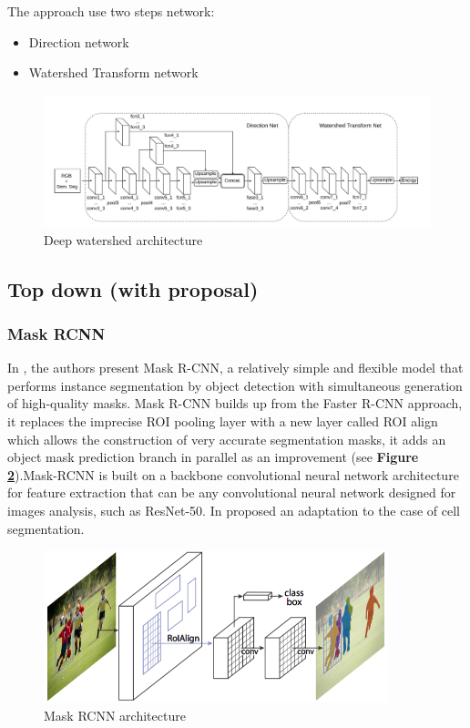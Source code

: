 \documentclass[main.tex]{subfiles}
\begin{document}
The approach use two steps network: 
\begin{itemize}
    \item Direction  network
    \item Watershed Transform network
\end{itemize}

\begin{figure}[H]
    \centering
    \includegraphics[width=16cm]{images/deepwatershed.png}
    \caption{Deep watershed architecture}
    \label{fig:deepwatershed}
\end{figure}



\subsection{Top down (with proposal)}
\subsubsection{Mask RCNN}
In \cite{he2017mask}, the authors present Mask R-CNN, a relatively simple and flexible model that performs instance segmentation by object detection with simultaneous generation of high-quality masks. Mask R-CNN builds up from the Faster R-CNN approach, it replaces the imprecise ROI pooling layer with a new layer called ROI align which allows the construction of very accurate segmentation masks, it adds an object mask prediction branch in parallel as an improvement (see \textbf{Figure \ref{fig:maskrcnn}}).Mask-RCNN is built on a backbone convolutional neural network architecture for feature extraction that can be any convolutional neural network designed for images analysis, such as ResNet-50. In \cite{johnson2018adapting} proposed an adaptation to the case of cell segmentation.

\begin{figure}[H]
    \centering
    \includegraphics[width=10cm]{images/mask-rcnn.png}
    \caption{Mask RCNN architecture}
    \label{fig:maskrcnn}
\end{figure}
\end{document}
